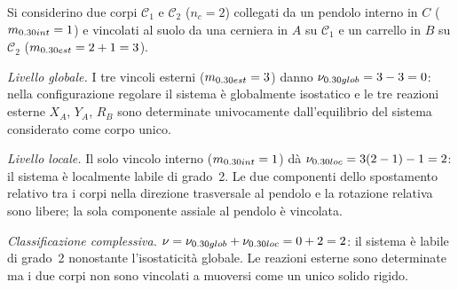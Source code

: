 \begin{esempio}
	\label{ex:glob_iso_loc_lab}
	Si considerino due corpi $\mathcal{C}_1$ e $\mathcal{C}_2$
	($n_c = 2$) collegati da un pendolo interno in $C$
	($m_{\rm int} = 1$) e vincolati al suolo da una cerniera
	in $A$ su $\mathcal{C}_1$ e un carrello in $B$ su
	$\mathcal{C}_2$ ($m_{\rm est} = 2 + 1 = 3$).
	
	\smallskip
	\noindent\textit{Livello globale.}
	I tre vincoli esterni ($m_{\rm est} = 3$) danno
	$\nu_{\rm glob} = 3 - 3 = 0$: nella configurazione
	regolare il sistema è globalmente isostatico e le tre
	reazioni esterne $X_A$, $Y_A$, $R_B$ sono determinate
	univocamente dall'equilibrio del sistema considerato come
	corpo unico.
	
	\smallskip
	\noindent\textit{Livello locale.}
	Il solo vincolo interno ($m_{\rm int} = 1$) dà
	$\nu_{\rm loc} = 3(2-1) - 1 = 2$: il sistema è
	localmente labile di grado~2. Le due componenti dello
	spostamento relativo tra i corpi nella direzione
	trasversale al pendolo e la rotazione relativa sono
	libere; la sola componente assiale al pendolo è vincolata.
	
	\smallskip
	\noindent\textit{Classificazione complessiva.}
	$\nu = \nu_{\rm glob} + \nu_{\rm loc} = 0 + 2 = 2$:
	il sistema è labile di grado~2 nonostante l'isostaticità
	globale. Le reazioni esterne sono determinate ma i due
	corpi non sono vincolati a muoversi come un unico
	solido rigido.
\end{esempio}

